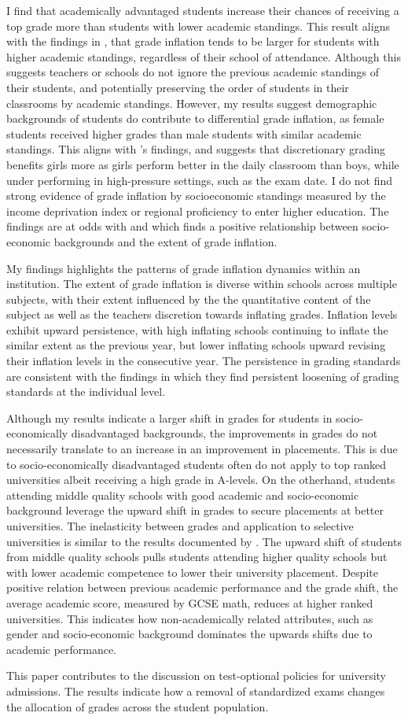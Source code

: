 I find that academically advantaged students increase their chances of receiving a top grade more than students with lower academic standings. This result aligns with the findings in \cite{TYNER2020102037}, that grade inflation tends to be larger for students with higher academic standings, regardless of their school of attendance. Although this suggests teachers or schools do not ignore the previous academic standings of their students, and potentially preserving the order of students in their classrooms by academic standings. However, my results suggest demographic backgrounds of students do contribute to differential grade inflation, as female students received higher grades than male students with similar academic standings. This aligns with \cite{lavy2018}'s findings, and suggests that discretionary grading benefits girls more as girls perform better in the daily classroom than boys, while under performing in high-pressure settings, such as the exam date. I do not find strong evidence of grade inflation by socioeconomic standings measured by the income deprivation index or regional proficiency to enter higher education. The findings are at odds with \cite{hanna2012} and \cite{burgess2013} which finds a positive relationship between socio-economic backgrounds and the extent of grade inflation.

My findings highlights the patterns of grade inflation dynamics within an institution. The extent of grade inflation is diverse within schools across multiple subjects, with their extent influenced by the the quantitative content of the subject as well as the teachers discretion towards inflating grades. Inflation levels exhibit upward persistence, with high inflating schools continuing to inflate the similar extent as the previous year, but lower inflating schools upward revising their inflation levels in the consecutive year. The persistence in grading standards are consistent with the findings in \cite{denning2023} which they find persistent loosening of grading standards at the individual level. 

Although my results indicate a larger shift in grades for students in socio-economically disadvantaged backgrounds, the improvements in grades do not necessarily translate to an increase in an improvement in placements. This is due to socio-economically disadvantaged students often do not apply to top ranked universities albeit receiving a high grade in A-levels. On the otherhand, students attending middle quality schools with good academic and socio-economic background leverage the upward shift in grades to secure placements at better universities. The inelasticity between grades and application to selective universities is similar to the results documented by \cite{NBERw18586}.  The upward shift of students from middle quality schools pulls students attending higher quality schools but with lower academic competence to lower their university placement. Despite positive relation between previous academic performance and the grade shift, the average academic score, measured by GCSE math, reduces at higher ranked universities. This indicates how non-academically related attributes, such as gender and socio-economic background dominates the upwards shifts due to academic performance. 

This paper contributes to the discussion on test-optional policies for university admissions. The results indicate how a removal of standardized exams changes the allocation of grades across the student population. 